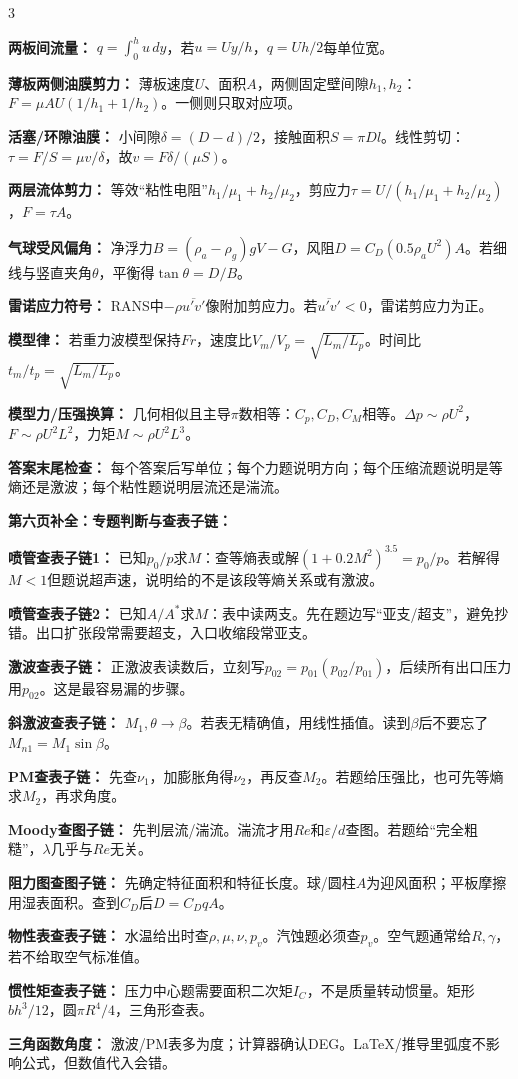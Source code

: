 \documentclass[a4paper]{article}
\newcommand{\sect}[1]{\par{\bfseries\color{Q}#1：}}
\begin{document}
\begin{multicols}{3}
{\sect{两板间流量}
$q=\int_0^hu\,dy$，若$u=Uy/h$，$q=Uh/2$每单位宽。
\sect{薄板两侧油膜剪力}
薄板速度$U$、面积$A$，两侧固定壁间隙$h_1,h_2$：$F=\mu AU(1/h_1+1/h_2)$。一侧则只取对应项。
\sect{活塞/环隙油膜}
小间隙$\delta=(D-d)/2$，接触面积$S=\pi Dl$。线性剪切：$\tau=F/S=\mu v/\delta$，故$v=F\delta/(\mu S)$。
\sect{两层流体剪力}
等效“粘性电阻”$h_1/\mu_1+h_2/\mu_2$，剪应力$\tau=U/(h_1/\mu_1+h_2/\mu_2)$，$F=\tau A$。
\sect{气球受风偏角}
净浮力$B=(\rho_a-\rho_g)gV-G$，风阻$D=C_D(0.5\rho_aU^2)A$。若细线与竖直夹角$\theta$，平衡得$\tan\theta=D/B$。
\sect{雷诺应力符号}
RANS中$-\rho\overline{u'v'}$像附加剪应力。若$\overline{u'v'}<0$，雷诺剪应力为正。
\sect{模型律}
若重力波模型保持$Fr$，速度比$V_m/V_p=\sqrt{L_m/L_p}$。时间比$t_m/t_p=\sqrt{L_m/L_p}$。
\sect{模型力/压强换算}
几何相似且主导$\pi$数相等：$C_p,C_D,C_M$相等。$\Delta p\sim\rho U^2$，$F\sim\rho U^2L^2$，力矩$M\sim\rho U^2L^3$。
\sect{答案末尾检查}
每个答案后写单位；每个力题说明方向；每个压缩流题说明是等熵还是激波；每个粘性题说明层流还是湍流。

\sect{第六页补全：专题判断与查表子链}
\sect{喷管查表子链1}
已知$p_0/p$求$M$：查等熵表或解$(1+0.2M^2)^{3.5}=p_0/p$。若解得$M<1$但题说超声速，说明给的不是该段等熵关系或有激波。
\sect{喷管查表子链2}
已知$A/A^*$求$M$：表中读两支。先在题边写“亚支/超支”，避免抄错。出口扩张段常需要超支，入口收缩段常亚支。
\sect{激波查表子链}
正激波表读数后，立刻写$p_{02}=p_{01}(p_{02}/p_{01})$，后续所有出口压力用$p_{02}$。这是最容易漏的步骤。
\sect{斜激波查表子链}
$M_1,\theta\to\beta$。若表无精确值，用线性插值。读到$\beta$后不要忘了$M_{n1}=M_1\sin\beta$。
\sect{PM查表子链}
先查$\nu_1$，加膨胀角得$\nu_2$，再反查$M_2$。若题给压强比，也可先等熵求$M_2$，再求角度。
\sect{Moody查图子链}
先判层流/湍流。湍流才用$Re$和$\varepsilon/d$查图。若题给“完全粗糙”，$\lambda$几乎与$Re$无关。
\sect{阻力图查图子链}
先确定特征面积和特征长度。球/圆柱$A$为迎风面积；平板摩擦用湿表面积。查到$C_D$后$D=C_DqA$。
\sect{物性表查表子链}
水温给出时查$\rho,\mu,\nu,p_v$。汽蚀题必须查$p_v$。空气题通常给$R,\gamma$，若不给取空气标准值。
\sect{惯性矩查表子链}
压力中心题需要面积二次矩$I_C$，不是质量转动惯量。矩形$bh^3/12$，圆$\pi R^4/4$，三角形查表。
\sect{三角函数角度}
激波/PM表多为度；计算器确认DEG。LaTeX/推导里弧度不影响公式，但数值代入会错。

}
\end{multicols}
\end{document}
